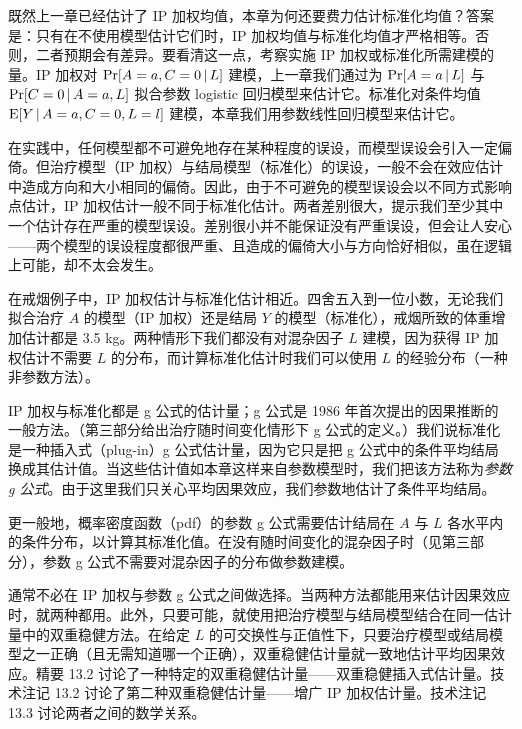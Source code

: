 既然上一章已经估计了 IP 加权均值，本章为何还要费力估计标准化均值？答案是：只有在不使用模型估计它们时，IP 加权均值与标准化均值才严格相等。否则，二者预期会有差异。要看清这一点，考察实施 IP 加权或标准化所需建模的量。IP 加权对 $\Pr[A=a,C=0\,|\, L]$ 建模，上一章我们通过为 $\Pr[A=a\,|\, L]$ 与 $\Pr[C=0\,|\, A=a,L]$ 拟合参数 logistic 回归模型来估计它。标准化对条件均值 $\mathrm{E}[Y\,|\, A=a,C=0,L=l]$ 建模，本章我们用参数线性回归模型来估计它。

在实践中，任何模型都不可避免地存在某种程度的误设，而模型误设会引入一定偏倚。但治疗模型（IP 加权）与结局模型（标准化）的误设，一般不会在效应估计中造成方向和大小相同的偏倚。因此，由于不可避免的模型误设会以不同方式影响点估计，IP 加权估计一般不同于标准化估计。两者差别很大，提示我们至少其中一个估计存在严重的模型误设。差别很小并不能保证没有严重误设，但会让人安心——两个模型的误设程度都很严重、且造成的偏倚大小与方向恰好相似，虽在逻辑上可能，却不太会发生。

在戒烟例子中，IP 加权估计与标准化估计相近。四舍五入到一位小数，无论我们拟合治疗 $A$ 的模型（IP 加权）还是结局 $Y$ 的模型（标准化），戒烟所致的体重增加估计都是 3.5 kg。两种情形下我们都没有对混杂因子 $L$ 建模，因为获得 IP 加权估计不需要 $L$ 的分布，而计算标准化估计时我们可以使用 $L$ 的经验分布（一种非参数方法）。

IP 加权与标准化都是 g 公式的估计量；g 公式是 1986 年首次提出的因果推断的一般方法。（第三部分给出治疗随时间变化情形下 g 公式的定义。）我们说标准化是一种插入式（plug-in）g 公式估计量，因为它只是把 g 公式中的条件平均结局换成其估计值。当这些估计值如本章这样来自参数模型时，我们把该方法称为\emph{参数 g 公式}。由于这里我们只关心平均因果效应，我们参数地估计了条件平均结局。

更一般地，概率密度函数（pdf）的参数 g 公式需要估计结局在 $A$ 与 $L$ 各水平内的条件分布，以计算其标准化值。在没有随时间变化的混杂因子时（见第三部分），参数 g 公式不需要对混杂因子的分布做参数建模。

通常不必在 IP 加权与参数 g 公式之间做选择。当两种方法都能用来估计因果效应时，就两种都用。此外，只要可能，就使用把治疗模型与结局模型结合在同一估计量中的双重稳健方法。在给定 $L$ 的可交换性与正值性下，只要治疗模型或结局模型之一正确（且无需知道哪一个正确），双重稳健估计量就一致地估计平均因果效应。精要 13.2 讨论了一种特定的双重稳健估计量——双重稳健插入式估计量。技术注记 13.2 讨论了第二种双重稳健估计量——增广 IP 加权估计量。技术注记 13.3 讨论两者之间的数学关系。

